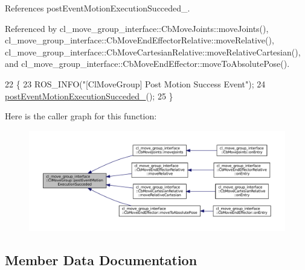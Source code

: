 References post\+Event\+Motion\+Execution\+Succeded\+\_\+.



Referenced by cl\+\_\+move\+\_\+group\+\_\+interface\+::\+Cb\+Move\+Joints\+::move\+Joints(), cl\+\_\+move\+\_\+group\+\_\+interface\+::\+Cb\+Move\+End\+Effector\+Relative\+::move\+Relative(), cl\+\_\+move\+\_\+group\+\_\+interface\+::\+Cb\+Move\+Cartesian\+Relative\+::move\+Relative\+Cartesian(), and cl\+\_\+move\+\_\+group\+\_\+interface\+::\+Cb\+Move\+End\+Effector\+::move\+To\+Absolute\+Pose().


\begin{DoxyCode}
22 \{
23     ROS\_INFO(\textcolor{stringliteral}{"[ClMoveGroup] Post Motion Success Event"});
24     \hyperlink{classcl__move__group__interface_1_1ClMoveGroup_a1e95dacf3393a4e4eff40395e8edfccd}{postEventMotionExecutionSucceded\_}();
25 \}
\end{DoxyCode}
Here is the caller graph for this function\+:
\nopagebreak
\begin{figure}[H]
\begin{center}
\leavevmode
\includegraphics[width=350pt]{classcl__move__group__interface_1_1ClMoveGroup_aebaf269db373d41837bae87651458e54_icgraph}
\end{center}
\end{figure}


\subsection{Member Data Documentation}
\mbox{\label{classcl__move__group__interface_1_1ClMoveGroup_a92922ea689e4e1b7b91512c56629c95b}} 
